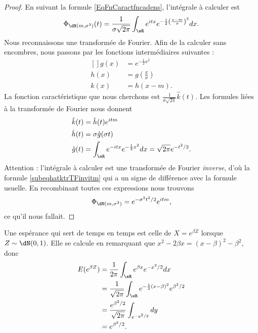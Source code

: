 \begin{proof}
    En suivant la formule \eqref{EqFnCaractfncadens}, l'intégrale à calculer est 
    \begin{equation}
        \Phi_{\dN(m,\sigma^2)}(t)=\frac{1}{ \sigma\sqrt{2\pi} }\int_{\eR} e^{itx} e^{-\frac{ 1 }{2}\left( \frac{ x-m }{ \sigma } \right)^2}dx.
    \end{equation}
    Nous reconnaissons une transformée de Fourier. Afin de la calculer sans encombres, nous passons par les fonctions intermédiaires suivantes :
    \begin{equation}
        \begin{aligned}[]
            g(x)&= e^{-\frac{ 1 }{2}x^2}\\
            h(x)&=g\left( \frac{ x }{ \sigma } \right)\\
            k(x)&=h(x-m).
        \end{aligned}
    \end{equation}
    La fonction caractéristique que nous cherchons est \( \frac{1}{ \sigma\sqrt{2\pi} }\hat k(t)\). Les formules liées à la transformée de Fourier nous donnent
    \begin{subequations}
        \begin{align}
            \hat k(t)&=\hat h(t) e^{itm}    \label{subeqhatktrTFinvitm}\\
            \hat h(t)&=\sigma\hat g(\sigma t)\\
            \hat g(t)&=\int_{\eR} e^{-itx} e^{-\frac{ 1 }{2}x^2}dx=\sqrt{2\pi} e^{-t^2/2}.
        \end{align}
    \end{subequations}
    Attention : l'intégrale à calculer est une transformée de Fourier \emph{inverse}, d'où la formule \eqref{subeqhatktrTFinvitm} qui a un signe de différence avec la formule usuelle. En recombinant toutes ces expressions nous trouvons
    \begin{equation}
        \Phi_{\dN(m,\sigma^2)}= e^{-\sigma^2t^2/2} e^{itm},
    \end{equation}
    ce qu'il nous fallait.
\end{proof}

\begin{example}
    Une espérance qui sert de temps en temps est celle de \( X= e^{\beta Z}\) lorsque \( Z\sim\dN(0,1)\). Elle se calcule en remarquant que \( x^2-2\beta x=(x-\beta)^2-\beta^2\), donc
    \begin{subequations}        \label{EqEspexpbetaZnorm}
        \begin{align}
            E( e^{\beta Z})&=\frac{1}{ 2\pi }\int_{\eR} e^{\beta x} e^{-x^2/2}dx\\
            &=\frac{1}{ \sqrt{2\pi} }\int_{\eR} e^{-\frac{ 1 }{2}(x-\beta)^2} e^{\beta^2/2}\\
            &=\frac{  e^{\beta^2/2} }{ \sqrt{2\pi} }\int_{ e^{-y^2/2}}dy\\
            &= e^{\beta^2/2}.
        \end{align}
    \end{subequations}
\end{example}


